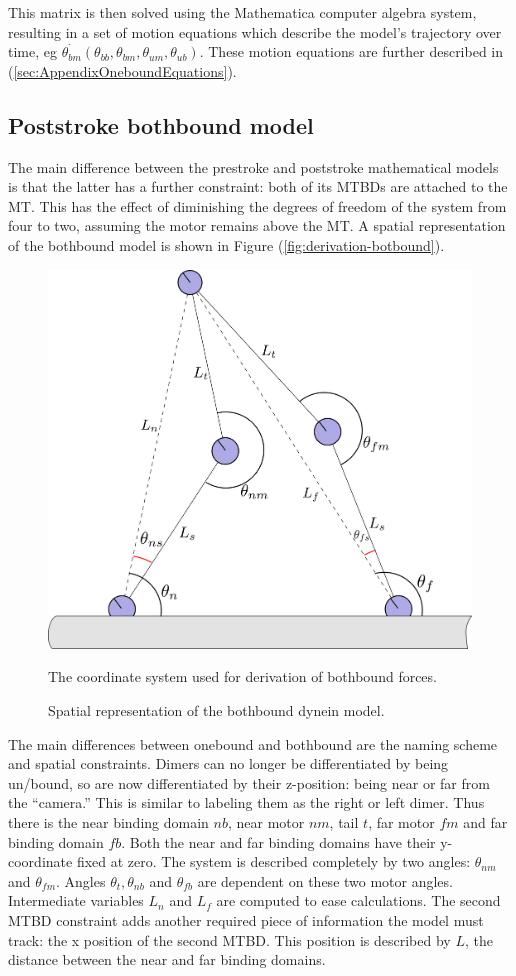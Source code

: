 \documentclass[
11pt, %
english, %
singlespacing, %
headsepline, %
chapterinoneline, %
]{MastersDoctoralThesis} %
\begin{document}
This matrix is then solved using the Mathematica computer algebra system, resulting in a set of motion equations which describe the model's trajectory over time, eg $\dot{\theta_{bm}}(\theta_{bb}, \theta_{bm}, \theta_{um}, \theta_{ub})$. These motion equations are further described in (\ref{sec:AppendixOneboundEquations}).\\

\subsection{Poststroke bothbound model}
The main difference between the prestroke and poststroke mathematical models is that the latter has a further constraint: both of its MTBDs are attached to the MT. This has the effect of diminishing the degrees of freedom of the system from four to two, assuming the motor remains above the MT. A spatial representation of the bothbound model is shown in Figure (\ref{fig:derivation-botbound}).\\

\begin{figure}[h]
  \centering
  \includegraphics[width=.45\textwidth]{../../figures/derivation-bothbound}
  \caption{Spatial representation of the bothbound dynein model.}{The coordinate system used for derivation of bothbound forces.}
  \label{fig:derivation-bothbound}
\end{figure}

The main differences between onebound and bothbound are the naming scheme and spatial constraints. Dimers can no longer be differentiated by being un/bound, so are now differentiated by their z-position: being near or far from the ``camera.'' This is similar to labeling them as the right or left dimer. Thus there is the near binding domain $nb$, near motor $nm$, tail $t$, far motor $fm$ and far binding domain $fb$. Both the near and far binding domains have their y-coordinate fixed at zero. The system is described completely by two angles: $\theta_{nm}$ and $\theta_{fm}$. Angles $\theta_t, \theta_{nb}$ and $\theta_{fb}$ are dependent on these two motor angles. Intermediate variables $L_{n}$ and $L_{f}$ are computed to ease calculations. The second MTBD constraint adds another required piece of information the model must track: the x position of the second MTBD. This position is described by $L$, the distance between the near and far binding domains.\\
\end{document}
